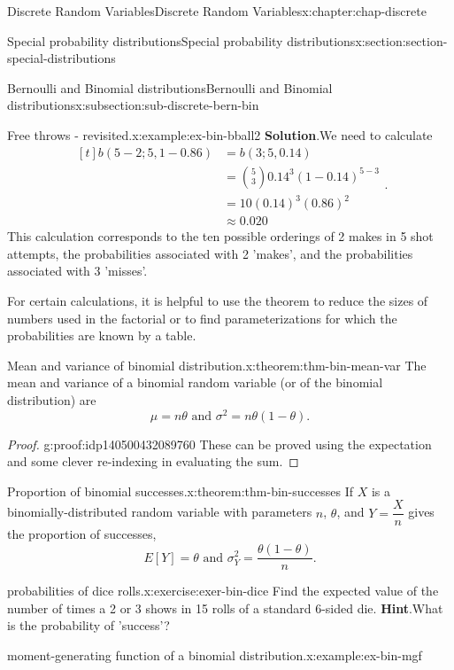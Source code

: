 \documentclass[oneside,10pt,]{book}
\newcommand{\blocktitlefont}{\relax}
\newcommand{\amp}{&}
\begin{document}
\begin{chapterptx}{Discrete Random Variables}{}{Discrete Random Variables}{}{}{x:chapter:chap-discrete}
\begin{sectionptx}{Special probability distributions}{}{Special probability distributions}{}{}{x:section:section-special-distributions}
\begin{subsectionptx}{Bernoulli and Binomial distributions}{}{Bernoulli and Binomial distributions}{}{}{x:subsection:sub-discrete-bern-bin}
\begin{example}{Free throws - revisited.}{x:example:ex-bin-bball2}
\textbf{\blocktitlefont Solution}.\quad{}We need to calculate%
\begin{equation*}
\begin{aligned}[t]
b(5-2; 5, 1-0.86) \amp = b(3; 5, 0.14)\\
\amp = {5\choose3}0.14^3(1-0.14)^{5-3}\\
\amp = 10(0.14)^3(0.86)^2\\
\amp \approx 0.020
\end{aligned}\text{.}
\end{equation*}
This calculation corresponds to the ten possible orderings of 2 makes in 5 shot attempts, the probabilities associated with 2 'makes', and the probabilities associated with 3 'misses'.%
\end{example}
For certain calculations, it is helpful to use the theorem to reduce the sizes of numbers used in the factorial or to find parameterizations for which the probabilities are known by a table.%
\begin{theorem}{Mean and variance of binomial distribution.}{}{x:theorem:thm-bin-mean-var}%
The mean and variance of a binomial random variable (or of the binomial distribution) are%
\begin{equation*}
\mu = n\theta \text{ and } \sigma^2 =
n\theta(1-\theta)\text{.}
\end{equation*}
%
\begin{proof}{}{g:proof:idp140500432089760}
These can be proved using the expectation and some clever re-indexing in evaluating the sum.%
\end{proof}
\end{theorem}
\begin{theorem}{Proportion of binomial successes.}{}{x:theorem:thm-bin-successes}%
If \(X\) is a binomially-distributed random variable with parameters \(n\), \(\theta\), and \(Y = \dfrac{X}{n}\) gives the proportion of successes,%
\begin{equation*}
E[Y] = \theta \text{ and } \sigma_Y^2 =
\dfrac{\theta(1-\theta)}{n}\text{.}
\end{equation*}
%
\end{theorem}
\begin{inlineexercise}{probabilities of dice rolls.}{x:exercise:exer-bin-dice}%
Find the expected value of the number of times a 2 or 3 shows in 15 rolls of a standard 6-sided die.%
\textbf{\blocktitlefont Hint}.\quad{}What is the probability of 'success'?\end{inlineexercise}
\begin{example}{moment-generating function of a binomial distribution.}{x:example:ex-bin-mgf}%

\end{example}
\end{subsectionptx}
\end{sectionptx}
\end{chapterptx}
\end{document}
